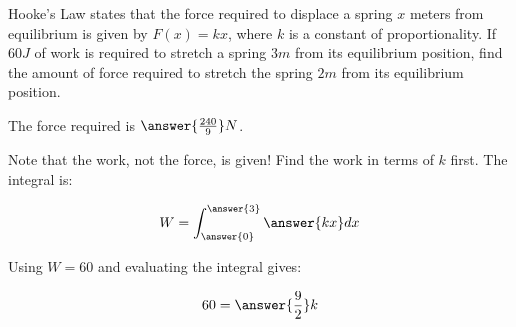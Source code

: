 \documentclass{ximera}
\author{Jim Talamo}
\begin{document}
\begin{exercise}

Hooke's Law states that the force required to displace a spring $x$ meters from equilibrium is given by $F(x) = kx$, where $k$ is a constant of proportionality.  If $60 J$ of work is required to stretch a spring $3 m$ from its equilibrium position, find the amount of force required to stretch the spring $2 m$ from its equilibrium position.

The force required is $\answer{\frac{240}{9}} N$.

\begin{hint}
Note that the work, not the force, is given!  Find the work in terms of $k$ first.  The integral is:

\[
W = \int_{\answer{0}}^{\answer{3}} \answer{ k x } dx
\]

\begin{question}
Using $W=60$ and evaluating the integral gives:

\[
60 = \answer{\frac{9}{2}} k
\]
\end{question}

\end{hint}

\end{exercise}
\end{document}
